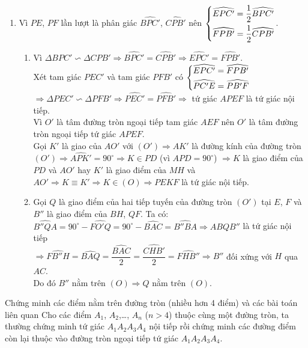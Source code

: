 \begin{bt}
{\begin{enumerate}
\item Vì $PE$, $PF$ lần lượt là phân giác $\widehat{BPC'}$, $\widehat{CPB'}$ nên $\left\{\begin{aligned}&\widehat{EPC'}=\dfrac{1}{2}\widehat{BPC'}\\ & \widehat{FPB'}=\dfrac{1}{2}\widehat{CPB'}\end{aligned}\right.$.
\begin{enumerate}
\item Vì $\Delta BPC'\backsim \Delta CPB'\Rightarrow \widehat{BPC'}=\widehat{CPB'}\Rightarrow \widehat{EPC'}=\widehat{FPB'}$.\\
Xét tam giác $PEC'$ và tam giác $PFB'$ có $\left\{\begin{aligned}&\widehat{EPC'}=\widehat{FPB'}\\ & \widehat{PC'E}=\widehat{PB'F}\end{aligned}\right.$\\
$\Rightarrow\Delta PEC'\backsim\Delta PFB'\Rightarrow\widehat{PEC'}=\widehat{PFB'}\Rightarrow$ tứ giác $APEF$ là tứ giác nội tiếp.\\
Vì $O'$ là tâm đường tròn ngoại tiếp tam giác $AEF$ nên $O'$ là tâm đường tròn ngoại tiếp tứ giác $APEF$.\\
Gọi $K'$ là giao của $AO'$ với $(O')\Rightarrow AK'$ là đường kính của đường tròn $(O')\Rightarrow \widehat{APK'}=90^{\circ}\Rightarrow K\in PD$ (vì $\widehat{APD}=90^{\circ}$) $\Rightarrow K$ là giao điểm của $PD$ và $AO'$ hay $K'$ là giao điểm của $MH$ và $AO'\Rightarrow K\equiv K'\Rightarrow K\in (O)\Rightarrow PEKF$ là tứ giác nội tiếp.
\item Gọi $Q$ là giao điểm của hai tiếp tuyến của đường tròn $(O')$ tại $E$, $F$ và $B''$ là giao điểm của $BH$, $QF$. Ta có:\\
$\widehat{B''QA}=90^{\circ}-\widehat{FO'Q}=90^{\circ}-\widehat{BAC}=\widehat{B''BA}\Rightarrow ABQB''$ là tứ giác nội tiếp\\
$\Rightarrow \widehat{FB''H}=\widehat{BAQ}=\dfrac{\widehat{BAC}}{2}=\dfrac{\widehat{CHB'}}{2}=\widehat{FHB''}\Rightarrow B''$ đối xứng với $H$ qua $AC$.\\
Do đó $B''$ nằm trên $(O)\Rightarrow Q$ nằm trên $(O)$.
\end{enumerate}
\end{enumerate}
}
\end{bt}
    
    



\begin{dang}{Chứng minh các điểm nằm trên đường tròn (nhiều hơn 4 điểm) và các bài toán liên quan}
Cho các điểm $A_1$, $A_2$,\ldots, $A_n$ ($n>4$) thuộc cùng một đường tròn, ta thường chứng minh tứ giác $A_1A_2A_3A_4$ nội tiếp rồi chứng minh các đường điểm còn lại thuộc vào đường tròn ngoại tiếp tứ giác $A_1A_2A_3A_4$.
\end{dang}


